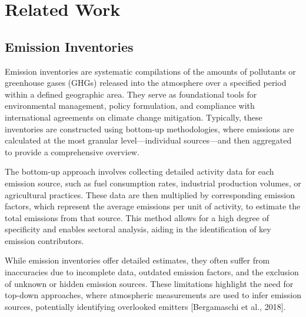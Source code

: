 
\chapter{Related Work}\label{chapter:related_work}

\section{Emission Inventories}
Emission inventories are systematic compilations of the amounts of pollutants or greenhouse gases (GHGs) released into the atmosphere over a specified period within a defined geographic area.
They serve as foundational tools for environmental management, policy formulation, and compliance with international agreements on climate change mitigation.
Typically, these inventories are constructed using bottom-up methodologies, where emissions are calculated at the most granular level—individual sources—and then aggregated to provide a comprehensive overview.

The bottom-up approach involves collecting detailed activity data for each emission source, such as fuel consumption rates, industrial production volumes, or agricultural practices.
These data are then multiplied by corresponding emission factors, which represent the average emissions per unit of activity, to estimate the total emissions from that source.
This method allows for a high degree of specificity and enables sectoral analysis, aiding in the identification of key emission contributors.

While emission inventories offer detailed estimates, they often suffer from inaccuracies due to incomplete data, outdated emission factors, and the exclusion of unknown or hidden emission sources.
These limitations highlight the need for top-down approaches, where atmospheric measurements are used to infer emission sources, potentially identifying overlooked emitters [Bergamaschi et al., 2018].



